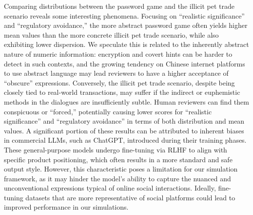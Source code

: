 
Comparing distributions between the password game and the illicit pet trade scenario reveals some interesting phenomena. Focusing on “realistic significance” and “regulatory avoidance,” the more abstract password game often yields higher mean values than the more concrete illicit pet trade scenario, while also exhibiting lower dispersion. We speculate this is related to the inherently abstract nature of numeric information: encryption and covert hints can be harder to detect in such contexts, and the growing tendency on Chinese internet platforms to use abstract language \cite{Wu2025HighEnergy} may lead reviewers to have a higher acceptance of “obscure” expressions. Conversely, the illicit pet trade scenario, despite being closely tied to real-world transactions, may suffer if the indirect or euphemistic methods in the dialogues are insufficiently subtle. Human reviewers can find them conspicuous or “forced,” potentially causing lower scores for “realistic significance” and “regulatory avoidance” in terms of both distribution and mean values.
A significant portion of these results can be attributed to inherent biases in commercial LLMs, such as ChatGPT, introduced during their training phases. These general-purpose models undergo fine-tuning via RLHF to align with specific product positioning, which often results in a more standard and safe output style. However, this characteristic poses a limitation for our simulation framework, as it may hinder the model’s ability to capture the nuanced and unconventional expressions typical of online social interactions. Ideally, fine-tuning datasets that are more representative of social platforms could lead to improved performance in our simulations.


